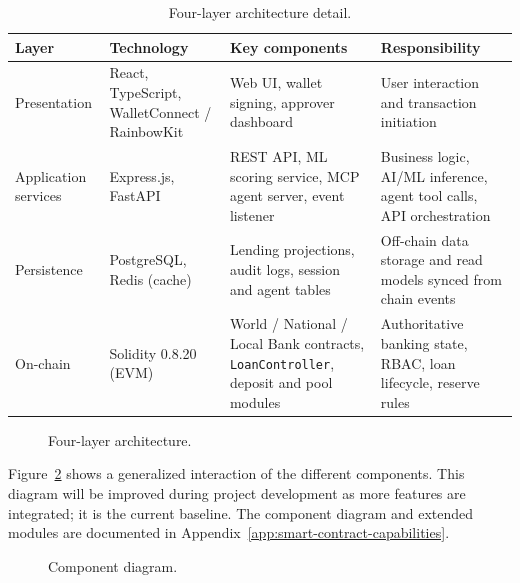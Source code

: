 \begin{table}[H]
\centering
\caption[Four-layer architecture detail]{Four-layer architecture detail.}
\label{tab:four-layer-arch}
\small
\begin{tabular}{@{}p{2.4cm}p{3.2cm}p{4.2cm}p{4.6cm}@{}}
\toprule
\tableheadcolor
\textbf{Layer} & \textbf{Technology} & \textbf{Key components} & \textbf{Responsibility} \\
\midrule
Presentation &
  React, TypeScript, WalletConnect / RainbowKit &
  Web UI, wallet signing, approver dashboard &
  User interaction and transaction initiation \\
\rowcolor{RowShade}
Application services &
  Express.js, FastAPI &
  REST API, ML scoring service, MCP agent server, event listener &
  Business logic, AI/ML inference, agent tool calls, API orchestration \\
Persistence &
  PostgreSQL, Redis (cache) &
  Lending projections, audit logs, session and agent tables &
  Off-chain data storage and read models synced from chain events \\
\rowcolor{RowShade}
On-chain &
  Solidity 0.8.20 (EVM) &
  World / National / Local Bank contracts, \texttt{LoanController}, deposit and pool modules &
  Authoritative banking state, RBAC, loan lifecycle, reserve rules \\
\bottomrule
\end{tabular}
\end{table}

\begin{figure}[H]
\centering
{}
\caption[Four-layer architecture]{Four-layer architecture.}
\label{fig:three-layer-arch}
\end{figure}

Figure~\ref{fig:component-diagram} shows a generalized interaction of the different components. This diagram will be improved during project development as more features are integrated; it is the current baseline. The component diagram and extended modules are documented in Appendix~\ref{app:smart-contract-capabilities}.

\begin{figure}[H]
\centering
{}
\caption[Component diagram]{Component diagram.}
\label{fig:component-diagram}
\end{figure}


